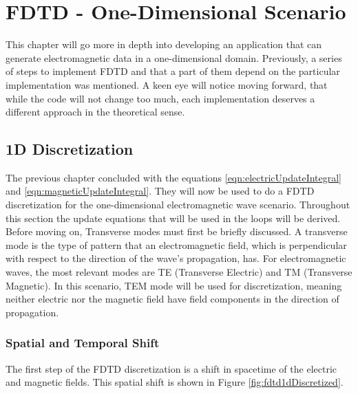 
\chapter{FDTD - One-Dimensional Scenario} %

\label{Chapter2} %

This chapter will go more in depth into developing an application that can generate electromagnetic data in a one-dimensional domain. Previously, a series of steps to implement FDTD and that a part of them depend on the particular implementation was mentioned. A keen eye will notice moving forward, that while the code will not change too much, each implementation deserves a different approach in the theoretical sense.


\section{1D Discretization}

The previous chapter concluded with the equations \ref{eqn:electricUpdateIntegral} and \ref{eqn:magneticUpdateIntegral}. They will now be used to do a FDTD discretization for the one-dimensional electromagnetic wave scenario. Throughout this section the update equations that will be used in the loops will be derived. Before moving on, Transverse modes must first be briefly discussed. A transverse mode is the type of pattern that an electromagnetic field, which is perpendicular with respect to the direction of the wave's propagation, has. For electromagnetic waves, the most relevant modes are TE (Transverse Electric) and TM (Transverse Magnetic). In this scenario, TEM mode will be used for discretization, meaning neither electric nor the magnetic field have field components in the direction of propagation.

\subsection{Spatial and Temporal Shift}

The first step of the FDTD discretization is a shift in spacetime of the electric and magnetic fields. This spatial shift is shown in Figure \ref{fig:fdtd1dDiscretized}.

